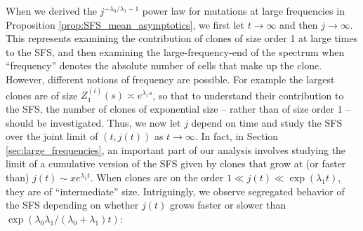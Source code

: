 \documentclass{article}
\numberwithin{equation}{section}
\begin{document}
When we derived the $j^{-\lambda_0/\lambda_1-1}$ power law for mutations at large frequencies in Proposition \ref{prop:SFS_mean_asymptotics}, we first let $t\to\infty$ and then $j\to\infty$. This represents examining the contribution of clones of size order 1 at large times to the SFS, and then examining the large-frequency-end of the spectrum when ``frequency'' denotes the absolute number of cells that make up the clone. However, different notions of frequency are possible. For example the largest clones are of size $Z_1^{(i)}(s)\asymp e^{\lambda_1 s}$, so that to understand their contribution to the SFS, the number of clones of exponential size -- rather than of size order $1$ -- should be investigated. Thus, we now let $j$ depend on time and study the SFS over the joint limit of $(t,j(t))$ as $t\to\infty$. In fact, in Section \ref{sec:large_frequencies}, an important part of our analysis involves studying the limit of a cumulative version of the SFS given by clones that grow at (or faster than) $j(t)\sim xe^{\lambda_1 t}$. When clones are on the order $1\ll j(t)\ll \exp(\lambda_1 t)$, they are of ``intermediate'' size. Intriguingly, we observe segregated behavior of the SFS depending on whether $j(t)$ grows faster or slower than $\exp\left(\lambda_0\lambda_1/(\lambda_0+\lambda_1)t\right)$:
\end{document}
